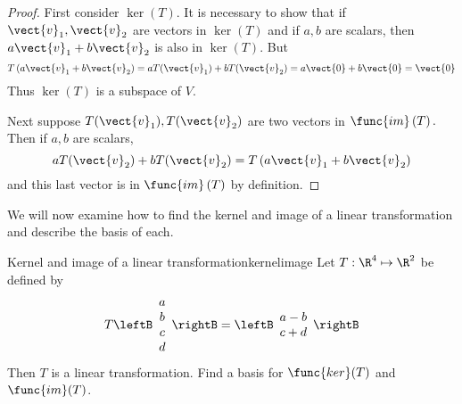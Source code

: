 \begin{proof}
First consider $\ker \left( T\right) .$ It is necessary to
show that if $\vect{v}_{1},\vect{v}_{2}$ are vectors in $\ker \left( T\right) $
and if $a,b$ are scalars, then $a\vect{v}_{1}+b\vect{v}_{2}$ is also in $\ker
\left( T\right) .$ But 
\begin{equation*}
T\left( a\vect{v}_{1}+b\vect{v}_{2}\right) =aT(\vect{v}_{1})+bT(\vect{v}_{2})=a\vect{0}+b\vect{0}=\vect{0}
\end{equation*}
Thus $\ker \left( T\right) $ is a subspace of $V$.

Next suppose $T(\vect{v}_{1}),T(\vect{v}_{2})$ are two vectors in $\func{im}\left(
T\right) .$ Then if $a,b$ are scalars, 
\begin{equation*}
aT(\vect{v}_{2})+bT(\vect{v}_{2})=T\left( a\vect{v}_{1}+b\vect{v}_{2}\right)
\end{equation*}
and this last vector is in $\func{im}\left( T\right) $ by definition. 
\end{proof}

We will now examine how to find the kernel and image of a linear transformation and describe the basis of each. 

\begin{example}{Kernel and image of a linear transformation}{kernelimage}
Let $T: \R^4 \mapsto \R^2$ be defined by
\[
T \leftB \begin{array}{c}
a \\
b \\
c \\
d
\end{array} \rightB = 
\leftB \begin{array}{c}
a - b \\ 
c + d
\end{array} \rightB
\]
Then $T$ is a linear transformation. Find a basis for $\func{ker}(T)$ and $\func{im}(T)$. 
\end{example}

